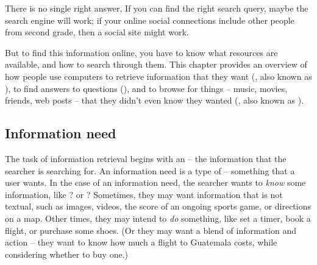 There is no single right answer. If you can find the right search query, maybe the search engine will work; if your online social connections include other people from second grade, then a social site might work.  

But to find this information online, you have to know what resources are available, and how to search through them.  This chapter provides an overview of how people use computers to retrieve information that they want (, also known as ),  to  find answers to questions (), and to browse for things  -- music, movies, friends, web posts -- that they didn't even know they wanted (, also known as ).  





\subsection{Information need}

\label{sec:information-need}

The task of information retrieval begins with an  -- the information that the searcher is searching for.  An information need is a type of  -- something that a user wants.  In the case of an information need, the searcher  wants to \emph{know} some information, like ? or ?    Sometimes, they may want information that is not textual, such as images, videos, the score of an ongoing sports game, or directions on a map.  Other times, they may intend to \emph{do} something, like set a timer, book a flight, or purchase some shoes.  (Or they may want a blend of information and action -- they want to know how much a flight to Guatemala costs, while considering whether to buy one.)   

